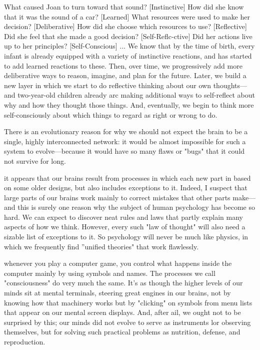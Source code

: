 \documentclass[10pt,a4paper]{article}
\begin{document}
What caused Joan to turn toward that sound? [Instinctive]
How did she know that it was the sound of a car? [Learned]
What resources were used to make her decision? [Deliberative]
How did she choose which resources to use? [Reflective]
Did she feel that she made a good decision? [Self-Reflc-ctive]
Did her actions live up to her principles? [Self-Conscious]
...
We know that by the time of birth, every infant is already equipped with a variety of instinctive reactions, and has started to add learned reactions to these. Then, over time, we progressively add more deliberative ways to reason, imagine, and plan for the future. Later, we build a new layer in which we start to do reflective thinking about our own thoughts—and two-year-old children already arc making additional ways to self-reflect about why and how they thought those things. And, eventually, we begin to think more self-consciously about which things to regard as right or wrong to do. \cite[p.~103]{minsky}

There is an evolutionary reason for why we should not expect the brain to be a single, highly interconnected network: it would be almost impossible for such a system to evolve—because it would have so many flaws or "bugs" that it could not survive for long. \cite[p.~104]{minsky}

it appears that our brains result from processes in which each new part in based on some older designs, but also includes exceptions to it. Indeed, I suspect that large parts of our brains work mainly to correct mistakes that other parts make—and this is surely one reason why the subject of human psychology has become so hard. We can expect to discover neat rules and laws that partly explain many aspects of how we think. However, every such "law of thought" will also need a sizable list of exceptions to it. So psychology will never be much like physics, in which we frequently find ''unified theories" that work flawlessly. \cite[p.~105]{minsky}

whenever you play a computer game, you control what happens inside the computer mainly by using symbols and names. The processes we call "consciousness" do very much the same. It's as though the higher levels of our minds sit at mental terminals, steering great engines in our brains, not by knowing how that machinery works but by "clicking" on symbols from menu lists that appear on our mental screen displays. And, after ail, we ought not to be surprised by this; our minds did not evolve to serve as instruments lor observing themselves, but for solving such practical problems as nutrition, defense, and reproduction. \cite[p.~109]{minsky}
\end{document}
